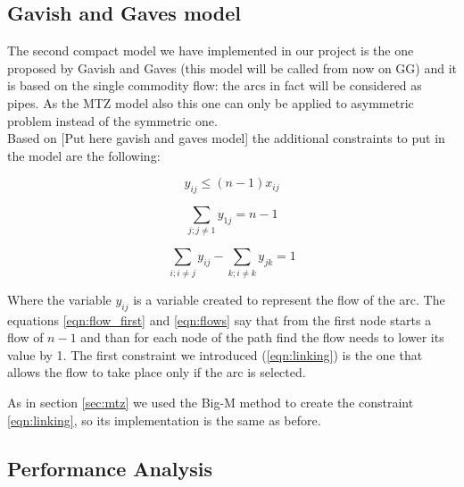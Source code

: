 \subsection{Gavish and Gaves model}
The second compact model we have implemented in our project is the one proposed by Gavish and Gaves (this model will be called from now on GG) and it is based on the single commodity flow: the arcs in fact will be considered as pipes. As the MTZ model also this one can only be applied to asymmetric problem instead of the symmetric one.\\
Based on [Put here gavish and gaves model] the additional constraints to put in the model are the following:

\begin{equation}
	\label{eqn:linking}
	y_{ij}\le (n-1)x_{ij}
\end{equation}

\begin{equation}
	\label{eqn:flow_first}
	\sum_{j;j\not=1}y_{1j}=n-1
\end{equation}

\begin{equation}
	\label{eqn:flows}
	\sum_{i;i\not=j}y_{ij}-\sum_{k;i\not=k}y_{jk}=1
\end{equation}

Where the variable $y_{ij}$ is a variable created to represent the flow of the arc. The equations \ref{eqn:flow_first} and \ref{eqn:flows} say that from the first node starts a flow of $n-1$ and than for each node of the path find the flow needs to lower its value by 1. The first constraint we introduced (\ref{eqn:linking}) is the one that allows the flow to take place only if the arc is selected.

As in section \ref{sec:mtz} we used the Big-M method to create the constraint \ref{eqn:linking}, so its implementation is the same as before.

\subsection{Performance Analysis}
